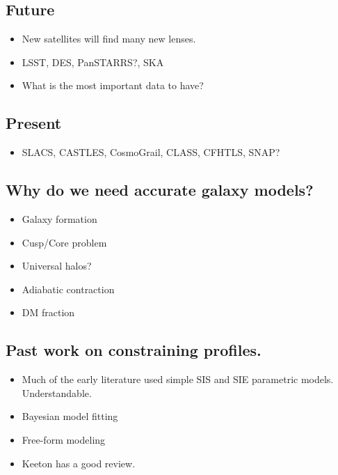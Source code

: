 \documentclass[onecolumn,galley]{mn2e}
\begin{document}
\subsection{Future} %
    \begin{itemize}
    \item New satellites will find many new lenses.
    \item LSST, DES, PanSTARRS?, SKA
    \item What is the most important data to have?
    \end{itemize}

\subsection{Present} %
    \begin{itemize}
    \item SLACS, CASTLES, CosmoGrail, CLASS, CFHTLS, SNAP?
    \end{itemize}

\subsection{Why do we need accurate galaxy models?} %
    \begin{itemize}
    \item Galaxy formation
    \item Cusp/Core problem
    \item Universal halos?
    \item Adiabatic contraction
    \item DM fraction
    \end{itemize}

\subsection{Past work on constraining profiles.} %
    \begin{itemize}
    \item Much of the early literature used simple SIS and SIE parametric models. Understandable.
    \item Bayesian model fitting
    \item Free-form modeling
    \item Keeton has a good review.
    \end{itemize}
\end{document}
